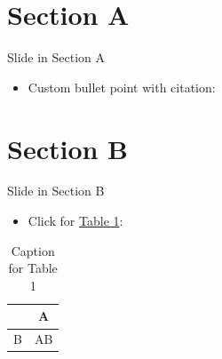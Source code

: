 \documentclass[aspectratio = 1610, english, 11pt, xcolor = dvipsnames]{beamer}
\begin{document}
  \section{Section A}
  \begin{frame}{Slide in Section A}
    \begin{itemize}
      \vspace{2mm}
      \begin{itemize}
        \vspace{2mm}
        \begin{itemize}
        \end{itemize}
      \end{itemize}
      \vspace{3mm}
      \item[$\rightarrow$] Custom bullet point with citation: \alert{\citet{mycitation}}
    \end{itemize}
  \end{frame}

  \section{Section B}
  \begin{frame}{Slide in Section B}
    \begin{itemize}
      \item Click for \alert{\hyperlink{tab:1}{Table 1}}:
    \end{itemize}
    \vspace{1mm}
    \begin{table}
      \centering
      \begin{tabular}{l|c}
        & A\\
        \hline
        B & AB\\
      \end{tabular}
      \caption{Caption for Table 1}
      \label{tab:1}
    \end{table}
  \end{frame}
\end{document}
